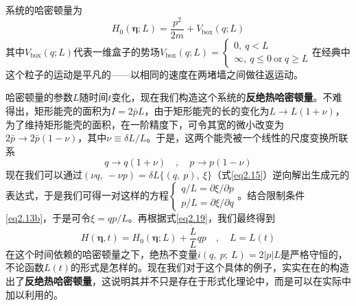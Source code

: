 系统的哈密顿量为
\begin{equation}
     H_{0}(\bm{\eta} ; L)=\frac{p^{2}}{2 m}+V_{\mathrm{box}}(q ; L)
        \label{eq2.18}
\end{equation}
其中$V_{\mathrm{box}}(q ; L)$代表一维盒子的势场$V_{\mathrm{box}}(q ; L) = \left\{\begin{array}{l} 0 ,\ q<L\\ \infty ,\ q \leq 0\ \text{or}\ q \geq L \end{array}\right.$在经典中这个粒子的运动是平凡的——以相同的速度在两堵墙之间做往返运动。
    
哈密顿量的参数$L$随时间$t$变化，现在我们构造这个系统的\textbf{反绝热哈密顿量}。不难得出，矩形能壳的面积为$I=2 \bar{p} L$，由于矩形能壳的长的变化为$L \to L(1+\nu)$，为了维持矩形能壳的面积，在一阶精度下，可令其宽的微小改变为$2 \bar{p} \to 2 \bar{p} (1-\nu)$，其中$\nu \equiv \delta L / L$。于是，这两个能壳被一个线性的尺度变换所联系
\begin{equation}
    q \rightarrow q(1+\nu) \quad, \quad p \rightarrow p(1-\nu)
    \label{eq2.19}
\end{equation}
现在我们可以通过$(\nu q,\ -\nu p)  = \delta L \{ (q,\ p),\ \xi \}$（式\ref{eq2.15}）逆向解出生成元的表达式，于是我们可得一对这样的方程$\left\{ \begin{array}{l} q / L=\partial \xi / \partial p \\ p / L=\partial \xi / \partial q \end{array}\right.$。结合限制条件\ref{eq2.13b}，于是可令$\xi = q p / L$。再根据式\ref{eq2.19}，我们最终得到
\begin{equation}
    H(\bm{\eta}, t)=H_{0}(\bm{\eta} ; L)+\frac{\dot{L}}{L} q p \quad, \quad L=L(t)
    \label{eq2.20}
\end{equation}
在这个时间依赖的哈密顿量之下，绝热不变量$i(q,\ p;\ L)=2 |p| L$是严格守恒的，不论函数$L(t)$的形式是怎样的。现在我们对于这个具体的例子，实实在在的构造出了\textbf{反绝热哈密顿量}，这说明其并不只是存在于形式化理论中，而是可以在实际中加以利用的。

